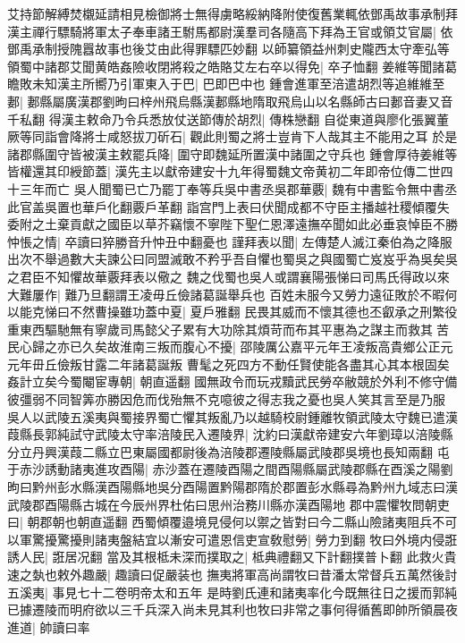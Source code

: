 艾持節解縛焚櫬延請相見檢御將士無得虜略綏納降附使復舊業輒依鄧禹故事承制拜漢主禪行驃騎將軍太子奉車諸王駙馬都尉漢羣司各隨高下拜為王官或領艾官屬|{
	依鄧禹承制授隗囂故事也後艾由此得罪驃匹妙翻}
以師纂領益州刺史隴西太守牽弘等領蜀中諸郡艾聞黄皓姦險收閉將殺之皓賂艾左右卒以得免|{
	卒子恤翻}
姜維等聞諸葛瞻敗未知漢主所嚮乃引軍東入于巴|{
	巴即巴中也}
鍾會進軍至涪遣胡烈等追維維至郪|{
	郪縣屬廣漢郡劉昫曰梓州飛烏縣漢郪縣地隋取飛烏山以名縣師古曰郪音妻又音千私翻}
得漢主敕命乃令兵悉放仗送節傳於胡烈|{
	傳株戀翻}
自從東道與廖化張翼董厥等同詣會降將士咸怒拔刀斫石|{
	觀此則蜀之將士豈肯下人哉其主不能用之耳}
於是諸郡縣圍守皆被漢主敕罷兵降|{
	圍守即魏延所置漢中諸圍之守兵也}
鍾會厚待姜維等皆權還其印綬節蓋|{
	漢先主以獻帝建安十九年得蜀魏文帝黄初二年即帝位傳二世四十三年而亡}
吳人聞蜀已亡乃罷丁奉等兵吳中書丞吳郡華覈|{
	魏有中書監令無中書丞此官盖吳置也華戶化翻覈戶革翻}
詣宫門上表曰伏聞成都不守臣主播越社稷傾覆失委附之土棄貢獻之國臣以草芥竊懷不寧陛下聖仁恩澤遠撫卒聞如此必垂哀悼臣不勝忡悵之情|{
	卒讀曰猝勝音升忡丑中翻憂也}
謹拜表以聞|{
	左傳楚人滅江秦伯為之降服出次不舉過數大夫諫公曰同盟滅敢不矜乎吾自懼也蜀吳之與國蜀亡岌岌乎為吳矣吳之君臣不知懼故華覈拜表以儆之}
魏之伐蜀也吳人或謂襄陽張悌曰司馬氏得政以來大難屢作|{
	難乃旦翻謂王凌毋丘儉諸葛誕舉兵也}
百姓未服今又勞力遠征敗於不暇何以能克悌曰不然曹操雖功蓋中夏|{
	夏戶雅翻}
民畏其威而不懷其德也丕叡承之刑繁役重東西驅馳無有寧歲司馬懿父子累有大功除其煩苛而布其平惠為之謀主而救其苦民心歸之亦已久矣故淮南三叛而腹心不擾|{
	邵陵厲公嘉平元年王凌叛高貴鄉公正元元年毌丘儉叛甘露二年諸葛誕叛}
曹髦之死四方不動任賢使能各盡其心其本根固矣姦計立矣今蜀閹宦專朝|{
	朝直遥翻}
國無政令而玩戎黷武民勞卒敝競於外利不修守備彼彊弱不同智筭亦勝因危而伐殆無不克噫彼之得志我之憂也吳人笑其言至是乃服　吳人以武陵五溪夷與蜀接界蜀亡懼其叛亂乃以越騎校尉鍾離牧領武陵太守魏已遣漢葭縣長郭純試守武陵太守率涪陵民入遷陵界|{
	沈約曰漢獻帝建安六年劉璋以涪陵縣分立丹興漢葭二縣立巴東屬國都尉後為涪陵郡遷陵縣屬武陵郡吳境也長知兩翻}
屯于赤沙誘動諸夷進攻酉陽|{
	赤沙蓋在遷陵酉陽之間酉陽縣屬武陵郡縣在酉溪之陽劉昫曰黔州彭水縣漢酉陽縣地吳分酉陽置黔陽郡隋於郡置彭水縣尋為黔州九域志曰漢武陵郡酉陽縣古城在今辰州界杜佑曰思州治務川縣亦漢酉陽地}
郡中震懼牧問朝吏曰|{
	朝郡朝也朝直遥翻}
西蜀傾覆邉境見侵何以禦之皆對曰今二縣山險諸夷阻兵不可以軍驚擾驚擾則諸夷盤結宜以漸安可遣恩信吏宣敎慰勞|{
	勞力到翻}
牧曰外境内侵誑誘人民|{
	誑居况翻}
當及其根柢未深而撲取之|{
	柢典禮翻又下計翻撲普卜翻}
此救火貴速之埶也敕外趣嚴|{
	趣讀曰促嚴装也}
撫夷將軍高尚謂牧曰昔潘太常督兵五萬然後討五溪夷|{
	事見七十二卷明帝太和五年}
是時劉氏連和諸夷率化今既無往日之援而郭純已據遷陵而明府欲以三千兵深入尚未見其利也牧曰非常之事何得循舊即帥所領晨夜進道|{
	帥讀曰率}

